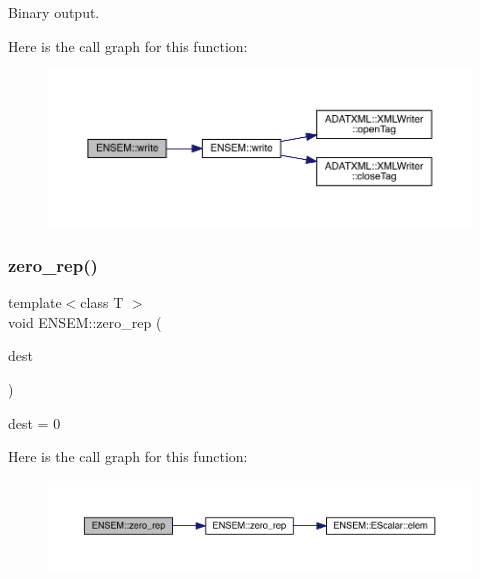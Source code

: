 Binary output. 

Here is the call graph for this function\+:\nopagebreak
\begin{figure}[H]
\begin{center}
\leavevmode
\includegraphics[width=350pt]{d9/ded/group__rscalar_ga22fa002fd1c18dfe5d521aef45102477_cgraph}
\end{center}
\end{figure}
\mbox{\label{group__rscalar_ga2d621f22841a02293225a92dcfcb4642}} 
\subsubsection{\texorpdfstring{zero\_rep()}{zero\_rep()}}
{\footnotesize\ttfamily template$<$class T $>$ \\
void E\+N\+S\+E\+M\+::zero\+\_\+rep (\begin{DoxyParamCaption}\item[{\mbox{\hyperlink{classENSEM_1_1RScalar}{R\+Scalar}}$<$ T $>$ \&}]{dest }\end{DoxyParamCaption})\hspace{0.3cm}{\ttfamily [inline]}}



dest = 0 

Here is the call graph for this function\+:\nopagebreak
\begin{figure}[H]
\begin{center}
\leavevmode
\includegraphics[width=350pt]{d9/ded/group__rscalar_ga2d621f22841a02293225a92dcfcb4642_cgraph}
\end{center}
\end{figure}
